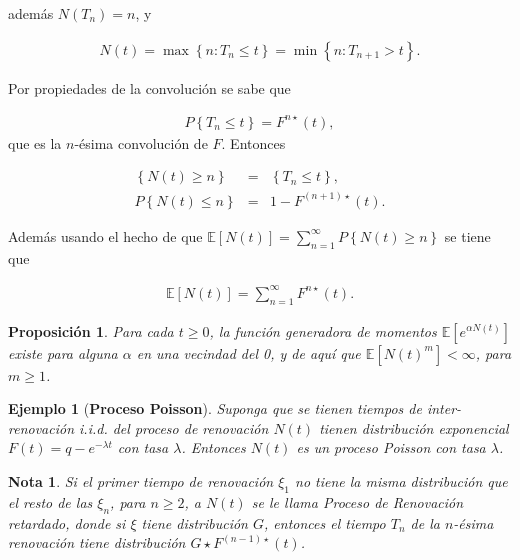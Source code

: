 \documentclass{article}
\newtheorem{Ejem}{Ejemplo}[section]
\newtheorem{Note}{Nota}%
\newtheorem{Prop}{Proposición}%
\newcommand{\esp}{\mathbb{E}}
\numberwithin{equation}{section}
\begin{document}
adem\'as $N\left(T_{n}\right)=n$, y 

\begin{eqnarray*}
N\left(t\right)=\max\left\{n:T_{n}\leq t\right\}=\min\left\{n:T_{n+1}>t\right\}.
\end{eqnarray*}

Por propiedades de la convoluci\'on se sabe que

\begin{eqnarray*}
P\left\{T_{n}\leq t\right\}=F^{n\star}\left(t\right),
\end{eqnarray*}
que es la $n$-\'esima convoluci\'on de $F$. Entonces 

\begin{eqnarray*}
\left\{N\left(t\right)\geq n\right\}&=&\left\{T_{n}\leq t\right\},\\
P\left\{N\left(t\right)\leq n\right\}&=&1-F^{\left(n+1\right)\star}\left(t\right).
\end{eqnarray*}

Adem\'as usando el hecho de que $\esp\left[N\left(t\right)\right]=\sum_{n=1}^{\infty}P\left\{N\left(t\right)\geq n\right\}$ se tiene que

\begin{eqnarray*}
\esp\left[N\left(t\right)\right]=\sum_{n=1}^{\infty}F^{n\star}\left(t\right).
\end{eqnarray*}

\begin{Prop}
Para cada $t\geq0$, la funci\'on generadora de momentos $\esp\left[e^{\alpha N\left(t\right)}\right]$ existe para alguna $\alpha$ en una vecindad del 0, y de aqu\'i que $\esp\left[N\left(t\right)^{m}\right]<\infty$, para $m\geq1$.
\end{Prop}

\begin{Ejem}[\textbf{Proceso Poisson}]
Suponga que se tienen tiempos de inter-renovaci\'on \textit{i.i.d.} del proceso de renovaci\'on $N\left(t\right)$ tienen distribuci\'on exponencial $F\left(t\right)=q-e^{-\lambda t}$ con tasa $\lambda$. Entonces $N\left(t\right)$ es un proceso Poisson con tasa $\lambda$.

\end{Ejem}



\begin{Note}
Si el primer tiempo de renovaci\'on $\xi_{1}$ no tiene la misma distribuci\'on que el resto de las $\xi_{n}$, para $n\geq2$, a $N\left(t\right)$ se le llama Proceso de Renovaci\'on retardado, donde si $\xi$ tiene distribuci\'on $G$, entonces el tiempo $T_{n}$ de la $n$-\'esima renovaci\'on tiene distribuci\'on $G\star F^{\left(n-1\right)\star}\left(t\right)$.
\end{Note}
\end{document}
